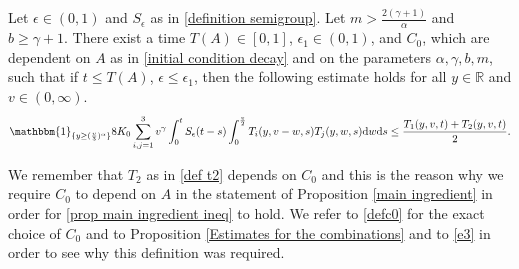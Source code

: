 \documentclass[11pt]{article}
\numberwithin{equation}{section}
\newcommand{\der}{\textup{d}}
\begin{document}
\begin{prop}\label{main ingredient}
Let $\epsilon\in(0,1)$ and $S_{\epsilon}$ as in \eqref{definition semigroup}. Let $m>\frac{2(\gamma+1)}{\alpha}$ and $b\geq \gamma+1$. There exist a time $T(A)\in[0,1]$, $\epsilon_{1}\in(0,1)$, and $C_{0}$, which are dependent on $A$ as in \eqref{initial condition decay}  and on the parameters $\alpha,\gamma,b,m$, such that  if $t\leq T(A)$, $\epsilon\leq \epsilon_{1}$, then the following estimate holds for all $y\in\mathbb{R}$ and $v\in(0,\infty)$. 
    \begin{align}\label{prop main ingredient ineq}
\mathbbm{1}_{\{y\geq (\frac{v}{3})^{\alpha}\}}   8K_{0} \sum_{i,j=1}^{3} v^{\gamma}\int_{0}^{t}S_{\epsilon}(t-s)\int_{0}^{\frac{v}{2}} T_{i}(y,v-w,s)T_{j}(y,w,s)\der w\der s\leq \frac{T_{1}(y,v,t)+T_{2}(y,v,t)}{2}.
\end{align} 
\end{prop}
\begin{rmk}
We remember that $T_{2}$ as in \eqref{def t2} depends on $C_{0}$ and this is the reason why we require $C_{0}$ to depend on $A$ in the statement of Proposition \ref{main ingredient} in order for \eqref{prop main ingredient ineq} to hold. We refer to \eqref{defc0} for the exact choice of $C_{0}$ and to Proposition \ref{Estimates for the combinations} and to \eqref{e3} in order to see why this definition was required.
\end{rmk}
\end{document}
